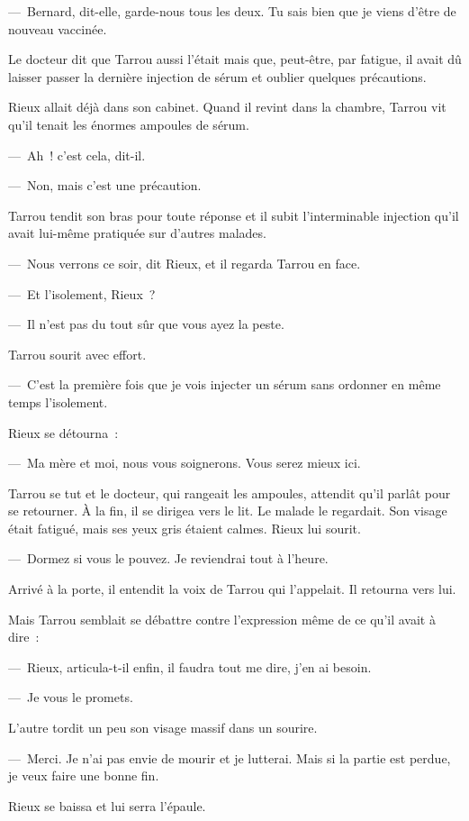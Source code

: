 \documentclass[french,twoside]{book} %
\begin{document}
— Bernard, dit-elle, garde-nous tous les deux. Tu sais bien que je viens d’être de nouveau vaccinée.\par
Le docteur dit que Tarrou aussi l’était mais que, peut-être, par fatigue, il avait dû laisser passer la dernière injection de sérum et oublier quelques précautions.\par
Rieux allait déjà dans son cabinet. Quand il revint dans la chambre, Tarrou vit qu’il tenait les énormes ampoules de sérum.\par
— Ah ! c’est cela, dit-il.\par
— Non, mais c’est une précaution.\par
Tarrou tendit son bras pour toute réponse et il subit l’interminable injection qu’il avait lui-même pratiquée sur d’autres malades.\par
— Nous verrons ce soir, dit Rieux, et il regarda Tarrou en face.\par
— Et l’isolement, Rieux ?\par
— Il n’est pas du tout sûr que vous ayez la peste.\par
Tarrou sourit avec effort.\par
— C’est la première fois que je vois injecter un sérum sans ordonner en même temps l’isolement.\par
Rieux se détourna :\par
— Ma mère et moi, nous vous soignerons. Vous serez mieux ici.\par
Tarrou se tut et le docteur, qui rangeait les ampoules, attendit qu’il parlât pour se retourner. À la fin, il se dirigea vers le lit. Le malade le regardait. Son visage était fatigué, mais ses yeux gris étaient calmes. Rieux lui sourit.\par
— Dormez si vous le pouvez. Je reviendrai tout à l’heure.\par
Arrivé à la porte, il entendit la voix de Tarrou qui l’appelait. Il retourna vers lui.\par
Mais Tarrou semblait se débattre contre l’expression même de ce qu’il avait à dire :\par
— Rieux, articula-t-il enfin, il faudra tout me dire, j’en ai besoin.\par
— Je vous le promets.\par
L’autre tordit un peu son visage massif dans un sourire.\par
— Merci. Je n’ai pas envie de mourir et je lutterai. Mais si la partie est perdue, je veux faire une bonne fin.\par
Rieux se baissa et lui serra l’épaule.\par
\end{document}
